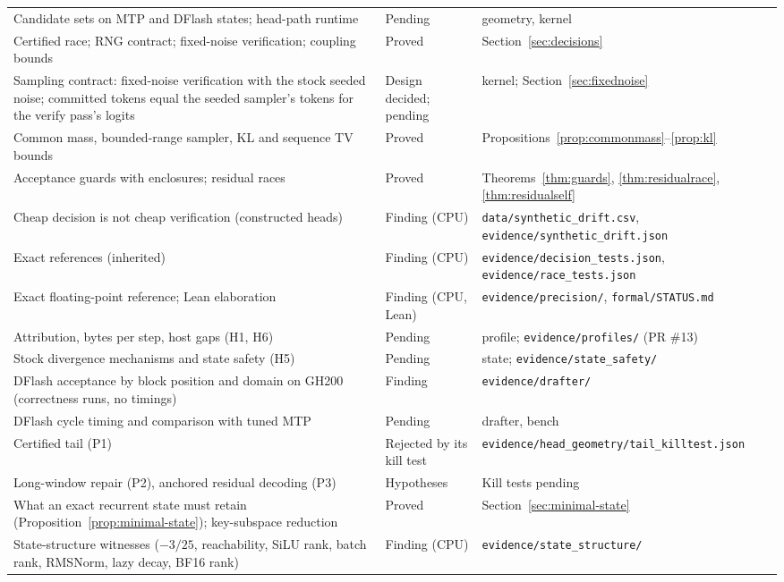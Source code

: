 \begin{longtable}{@{}P{6.2cm}P{2.1cm}P{5.9cm}@{}}
Candidate sets on MTP and DFlash states; head-path runtime & Pending & geometry, kernel\\
Certified race; RNG contract; fixed-noise verification; coupling bounds & Proved & Section~\ref{sec:decisions}\\
Sampling contract: fixed-noise verification with the stock seeded noise; committed tokens equal the seeded sampler's tokens for the verify pass's logits & Design decided; pending & kernel; Section~\ref{sec:fixednoise}\\
Common mass, bounded-range sampler, KL and sequence TV bounds & Proved & Propositions~\ref{prop:commonmass}--\ref{prop:kl}\\
Acceptance guards with enclosures; residual races & Proved & Theorems~\ref{thm:guards}, \ref{thm:residualrace}, \ref{thm:residualself}\\
Cheap decision is not cheap verification (constructed heads) & Finding (CPU) & \nolinkurl{data/synthetic_drift.csv}, \nolinkurl{evidence/synthetic_drift.json}\\
Exact references (inherited) & Finding (CPU) & \nolinkurl{evidence/decision_tests.json}, \nolinkurl{evidence/race_tests.json}\\
Exact floating-point reference; Lean elaboration & Finding (CPU, Lean) & \nolinkurl{evidence/precision/}, \nolinkurl{formal/STATUS.md}\\
Attribution, bytes per step, host gaps (H1, H6) & Pending & profile; \nolinkurl{evidence/profiles/} (PR \#13)\\
Stock divergence mechanisms and state safety (H5) & Pending & state; \nolinkurl{evidence/state_safety/}\\
DFlash acceptance by block position and domain on GH200 (correctness runs, no timings) & Finding & \nolinkurl{evidence/drafter/}\\
DFlash cycle timing and comparison with tuned MTP & Pending & drafter, bench\\
Certified tail (P1) & Rejected by its kill test & \nolinkurl{evidence/head_geometry/tail_killtest.json}\\
Long-window repair (P2), anchored residual decoding (P3) & Hypotheses & Kill tests pending\\
What an exact recurrent state must retain (Proposition~\ref{prop:minimal-state}); key-subspace reduction & Proved & Section~\ref{sec:minimal-state}\\
State-structure witnesses ($-3/25$, reachability, SiLU rank, batch rank, RMSNorm, lazy decay, BF16 rank) & Finding (CPU) & \nolinkurl{evidence/state_structure/}\\

\end{longtable}
